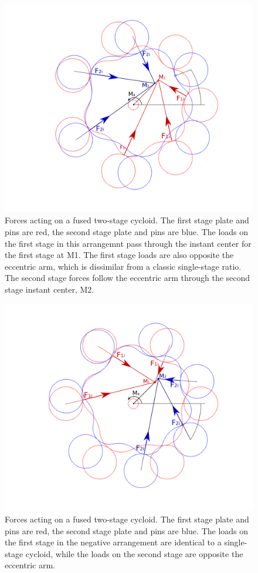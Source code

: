 \begin{figure}[t]
	\centering
	\includegraphics[width=0.80\linewidth]{fig/two_stage_loads_pos}
   \caption{Forces acting on a fused two-stage cycloid. The first stage plate and pins are red, the second stage plate and pins are blue. The loads on the first stage in this arrangemnt pass through the instant center for the first stage at M1. The first stage loads are also opposite the eccentric arm, which is dissimilar from a classic single-stage ratio. The second stage forces follow the eccentric arm through the second stage instant center, M2. }
   \label{fig:two_stage_force_pos}
\end{figure}

\begin{figure}[t]
	\centering
	\includegraphics[width=0.80\linewidth]{fig/two_stage_loads_neg}
   \caption{Forces acting on a fused two-stage cycloid. The first stage plate and pins are red, the second stage plate and pins are blue. The loads on the first stage in the negative arrangement are identical to a single-stage cycloid, while the loads on the second stage are opposite the eccentric arm.}
   \label{fig:two_stage_force_neg}
\end{figure}

